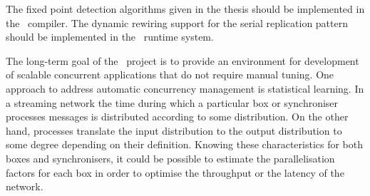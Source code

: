 The fixed point detection algorithms given in the thesis should be implemented in the \ak\ compiler. The dynamic rewiring support for the serial replication pattern should be implemented in the \ak\ runtime system.

The long-term goal of the \ak\ project is to provide an environment for development of scalable concurrent applications that do not require manual tuning. One approach to address automatic concurrency management is statistical learning. In a streaming network the time during which a particular box or synchroniser processes messages is distributed according to some distribution. On the other hand, processes translate the input distribution to the output distribution to some degree depending on their definition. Knowing these characteristics for both boxes and synchronisers, it could be possible to estimate the parallelisation factors for each box in order to optimise the throughput or the latency of the network.
